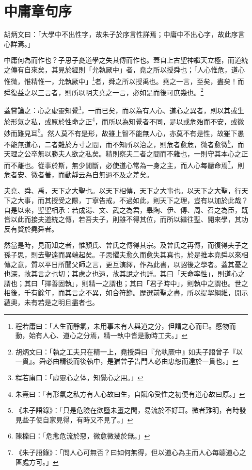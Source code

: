 \documentclass[hyperref, UTF8, 12pt, a4paper]{ctexrep}
\begin{document}
\newpage
\section{中庸章句序}

{\kaishu 胡炳文曰：「大學中不出性字，故朱子於序言性詳焉；中庸中不出心字，故此序言心詳焉。」}

中庸何為而作也？子思子憂道學之失其傳而作也。蓋自上古聖神繼天立極，而道統之傳有自來矣，其見於經則「允執厥中」者，堯之所以授舜也；「人心惟危，道心惟微，惟精惟一，允執厥中」\footnote{程若庸曰：「人生而靜氣，未用事未有人與道之分，但謂之心而已。感物而動，始有人心、道心之分焉，精一執中皆是動時工夫。」}者，舜之所以授禹也。堯之一言，至矣，盡矣！而舜復益之以三言者，則所以明夫堯之一言，必如是而後可庶幾也。\footnote{胡炳文曰：「執之工夫只在精一上，堯授舜曰『允執厥中』如夫子語曾子『以一貫』。舜必由精後而後執中，是猶曾子告門人必由忠恕而達於一貫也。」}

蓋嘗論之：心之虛靈知覺\footnote{程若庸曰：「虛靈心之体，知覺心之用。」}，一而已矣，而以為有人心、道心之異者，則以其或生於形氣之私，或原於性命之正\footnote{朱熹曰：「有形氣之私方有人心故曰生，自賦命受性之初便有道心故曰原。」}，而所以為知覺者不同，是以或危殆而不安，或微妙而難見耳\footnote{《朱子語錄》：「只是危險在欲墮未墮之間，易流於不好耳。微者難明，有時發見些子使自家見得，有時又不見了。」}。然人莫不有是形，故雖上智不能無人心，亦莫不有是性，故雖下愚不能無道心，二者雜於方寸之間，而不知所以治之，則危者愈危，微者愈微\footnote{陳櫟曰：「危愈危流於惡，微愈微幾於無。」}，而天理之公卒無以勝夫人欲之私矣。精則察夫二者之間而不雜也，一則守其本心之正而不離也。從事於斯，無少閒斷，必使道心常為一身之主，而人心每聽命焉\footnote{《朱子語錄》：「問人心可無否？曰如何無得，但以道心為主而人心每聼道心之區處方可。」}，則危者安、微者著，而動靜云為自無過不及之差矣。

夫堯、舜、禹，天下之大聖也。以天下相傳，天下之大事也。以天下之大聖，行天下之大事，而其授受之際，丁寧告戒，不過如此，則天下之理，豈有以加於此哉？自是以來，聖聖相承：若成湯、文、武之為君，皋陶、伊、傅、周、召之為臣，既皆以此而接夫道統之傳，若吾夫子，則雖不得其位，而所以繼往聖、開來學，其功反有賢於堯舜者。

然當是時，見而知之者，惟顏氏、曾氏之傳得其宗。及曾氏之再傳，而復得夫子之孫子思，則去聖遠而異端起矣。子思懼夫愈久而愈失其真也，於是推本堯舜以來相傳之意，質以平日所聞父師之言，更互演繹，作為此書，以詔後之學者。蓋其憂之也深，故其言之也切；其慮之也遠，故其說之也詳。其曰「天命率性」，則道心之謂也；其曰「擇善固執」，則精一之謂也；其曰「君子時中」，則執中之謂也。世之相後，千有餘年，而其言之不異，如合符節。歷選前聖之書，所以提挈綱維，開示蘊奧，未有若是之明且盡者也。
\end{document}
